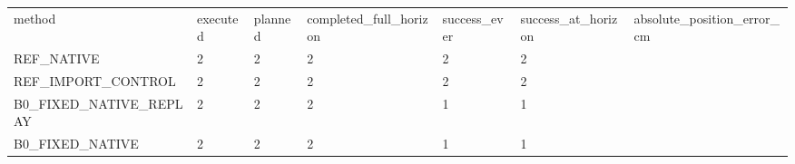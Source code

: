 \begin{tabular}{lllllll}
method & executed & planned & completed\_full\_horizon & success\_ever & success\_at\_horizon & absolute\_position\_error\_cm \\
REF\_NATIVE & 2 & 2 & 2 & 2 & 2 &  \\
REF\_IMPORT\_CONTROL & 2 & 2 & 2 & 2 & 2 &  \\
B0\_FIXED\_NATIVE\_REPLAY & 2 & 2 & 2 & 1 & 1 &  \\
B0\_FIXED\_NATIVE & 2 & 2 & 2 & 1 & 1 &  \\
\end{tabular}
